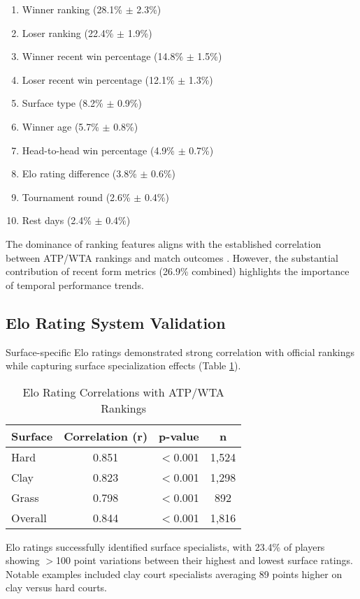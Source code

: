 \documentclass[11pt,a4paper]{article}
\begin{document}
\begin{enumerate}
    \item Winner ranking (28.1\% $\pm$ 2.3\%)
    \item Loser ranking (22.4\% $\pm$ 1.9\%)
    \item Winner recent win percentage (14.8\% $\pm$ 1.5\%)
    \item Loser recent win percentage (12.1\% $\pm$ 1.3\%)
    \item Surface type (8.2\% $\pm$ 0.9\%)
    \item Winner age (5.7\% $\pm$ 0.8\%)
    \item Head-to-head win percentage (4.9\% $\pm$ 0.7\%)
    \item Elo rating difference (3.8\% $\pm$ 0.6\%)
    \item Tournament round (2.6\% $\pm$ 0.4\%)
    \item Rest days (2.4\% $\pm$ 0.4\%)
\end{enumerate}

The dominance of ranking features aligns with the established correlation between ATP/WTA rankings and match outcomes \citep{boulier2003predicting}. However, the substantial contribution of recent form metrics (26.9\% combined) highlights the importance of temporal performance trends.

\subsection{Elo Rating System Validation}

Surface-specific Elo ratings demonstrated strong correlation with official rankings while capturing surface specialization effects (Table \ref{tab:elo}).

\begin{table}[h]
\centering
\caption{Elo Rating Correlations with ATP/WTA Rankings}
\label{tab:elo}
\begin{tabular}{@{}lccc@{}}
\toprule
Surface & Correlation (r) & p-value & n \\
\midrule
Hard & 0.851 & $<$0.001 & 1,524 \\
Clay & 0.823 & $<$0.001 & 1,298 \\
Grass & 0.798 & $<$0.001 & 892 \\
Overall & 0.844 & $<$0.001 & 1,816 \\
\bottomrule
\end{tabular}
\end{table}

Elo ratings successfully identified surface specialists, with 23.4\% of players showing $>$100 point variations between their highest and lowest surface ratings. Notable examples included clay court specialists averaging 89 points higher on clay versus hard courts.
\end{document}
